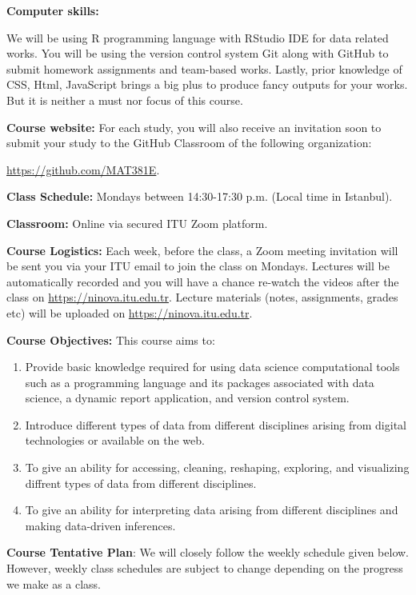 \documentclass[
  12pt,
]{article}
\providecommand{\tightlist}{%
  \setlength{\itemsep}{0pt}\setlength{\parskip}{0pt}}
\begin{document}
\textbf{Computer skills:}

We will be using R programming language with RStudio IDE for data
related works. You will be using the version control system Git along
with GitHub to submit homework assignments and team-based works. Lastly,
prior knowledge of CSS, Html, JavaScript brings a big plus to produce
fancy outputs for your works. But it is neither a must nor focus of this
course.

\textbf{Course website:} For each study, you will also receive an
invitation soon to submit your study to the GitHub Classroom of the
following organization:

\url{https://github.com/MAT381E}.

\textbf{Class Schedule:} Mondays between 14:30-17:30 p.m. (Local time in
Istanbul).

\textbf{Classroom:} Online via secured ITU Zoom platform.

\textbf{Course Logistics:} Each week, before the class, a Zoom meeting
invitation will be sent you via your ITU email to join the class on
Mondays. Lectures will be automatically recorded and you will have a
chance re-watch the videos after the class on
\href{Ninova}{https://ninova.itu.edu.tr}. Lecture materials (notes,
assignments, grades etc) will be uploaded on
\href{Ninova}{https://ninova.itu.edu.tr}.

\textbf{Course Objectives:} This course aims to:

\begin{enumerate}
\def\labelenumi{\arabic{enumi}.}
\tightlist
\item
  Provide basic knowledge required for using data science computational
  tools such as a programming language and its packages associated with
  data science, a dynamic report application, and version control
  system.
\item
  Introduce different types of data from different disciplines arising
  from digital technologies or available on the web.
\item
  To give an ability for accessing, cleaning, reshaping, exploring, and
  visualizing diffrent types of data from different disciplines.
\item
  To give an ability for interpreting data arising from different
  disciplines and making data-driven inferences.
\end{enumerate}

\textbf{Course Tentative Plan}: We will closely follow the weekly
schedule given below. However, weekly class schedules are subject to
change depending on the progress we make as a class.
\end{document}
